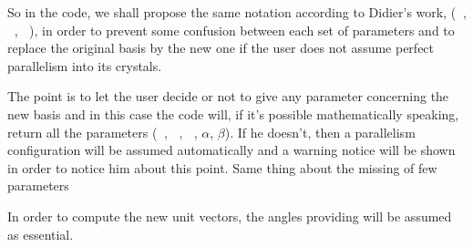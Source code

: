 \documentclass[a4paper,11pt,twoside,openright]{article}
\DeclareMathOperator{\ei}{\underline{e}_1}
\DeclareMathOperator{\et}{\underline{e}_2}
\DeclareMathOperator{\nout}{\underline{n}_{out}}
\begin{document}
So in the code, we shall propose the same notation according to Didier's work, ($\nout$, $\ei$, $\et$), in order to prevent some confusion between each set of parameters and to replace the original basis by the new one if the user does not assume perfect parallelism into its crystals. \par
The point is to let the user decide or not to give any parameter concerning the new basis and in this case the code will, if it's possible mathematically speaking, return all the parameters ($\nout$, $\ei$, $\et$, $\alpha$, $\beta$). If he doesn't, then a parallelism configuration will be assumed automatically and a warning notice will be shown in order to notice him about this point. Same thing about the missing of few parameters\par 
In order to compute the new unit vectors, the angles providing will be assumed as essential.
\end{document}
